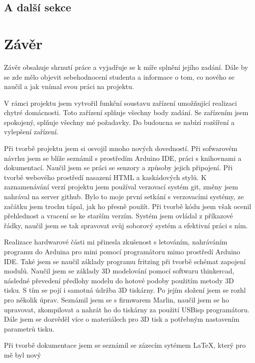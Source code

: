 \documentclass[11pt,a4paper,twoside,openright]{report}
\begin{document}
\section{A další sekce}


\chapter*{Závěr}
\pagestyle{empty}


Závěr obsahuje shrnutí práce a vyjadřuje se k míře splnění jejího zadání. Dále by se zde mělo objevit sebehodnocení studenta a informace o tom, co nového se naučil a jak vnímal svou práci na projektu.

V rámci projektu jsem vytvořil funkční soustavu zařízení umožňující realizaci chytré domácnosti. Toto zařízení splňuje všechny body zadání. Se zařízením jsem spokojený, splňuje všechny mé požadavky. Do budoucna se nabízí rozšíření a vylepšení zařízení.


Při tvorbě projektu jsem si osvojil mnoho nových dovedností. Při sofwarovém návrhu jsem se blíže seznámil s prostředím Arduino IDE, práci s knihovnami a dokumentací. Naučil jsem se práci se senzory a způsoby jejich připojení. Při tvorbě webového prostředí nasazení HTML a kaskádových stylů. K zaznamenávání verzí projektu jsem používal verzovací systém git, změny jsem nahrával na server github. Bylo to moje první setkání s verzovacími systémy, ze začátku jsem trochu tápal, jak ho přesně použít. Při tvorbě kódu jsem však ocenil přehlednost a vracení se ke starším verzím. Systém jsem ovládal z příkazové řádky, naučil jsem se tak spravovat svůj soborový systém a efektivní práci s ním.


Realizace hardwarové části mi přinesla zkušenost s letováním, nahráváním programu do Arduina pro mini pomocí programátoru mimo prostředí Arduino IDE. Také jsem se naučil základy programu fritzing při tvorbě schémat zapojení modulů. Naučil jsem se základy 3D modelování pomocí softwaru thinkercad, následné převedení předlohy modelu do hotové podoby použitím metody 3D tisku. S tím se pojí i samotná údržba 3D tiskárny. Po jejím složení jsem se rozhl pro několik úprav. Seznámil jsem se s firmwarem Marlin, naučil jsem se ho upravovat, zkompilovat a nahrát ho do tiskárny za použití USBisp programátoru. Dále jsem se dozvěděl více o materiálech pro 3D tisk a potřebným nastavením parametrů tisku.


Při tvorbě dokumentace jsem se seznámil se zázecím sytémem \LaTeX, který pro mě byl nový 
\end{document}
